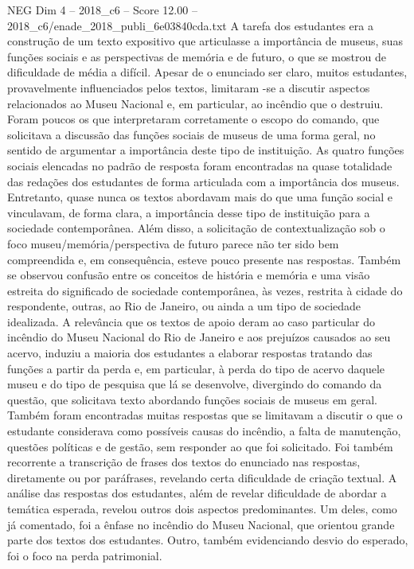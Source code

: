 \begin{textsample}{NEG Dim 4 – 2018\_c6 – Score 12.00 – 2018\_c6/enade\_2018\_publi\_6e03840cda.txt}
A tarefa dos estudantes era a construção de um texto expositivo que articulasse a importância de museus, suas funções sociais e as perspectivas de memória e de futuro, o que se mostrou de dificuldade de média a difícil.
Apesar de o enunciado ser claro, muitos estudantes, provavelmente influenciados pelos textos, limitaram -se a discutir aspectos relacionados ao Museu Nacional e, em particular, ao incêndio que o destruiu.
Foram poucos os que interpretaram corretamente o escopo do comando, que solicitava a discussão das funções sociais de museus de uma forma geral, no sentido de argumentar a importância deste tipo de instituição.
As quatro funções sociais elencadas no padrão de resposta foram encontradas na quase totalidade das redações dos estudantes de forma articulada com a importância dos museus.
Entretanto, quase nunca os textos abordavam mais do que uma função social e vinculavam, de forma clara, a importância desse tipo de instituição para a sociedade contemporânea.
Além disso, a solicitação de contextualização sob o foco museu/memória/perspectiva de futuro parece não ter sido bem compreendida e, em consequência, esteve pouco presente nas respostas.
Também se observou confusão entre os conceitos de história e memória e uma visão estreita do significado de sociedade contemporânea, às vezes, restrita à cidade do respondente, outras, ao Rio de Janeiro, ou ainda a um tipo de sociedade idealizada.
A relevância que os textos de apoio deram ao caso particular do incêndio do Museu Nacional do Rio de Janeiro e aos prejuízos causados ao seu acervo, induziu a maioria dos estudantes a elaborar respostas tratando das funções a partir da perda e, em particular, à perda do tipo de acervo daquele museu e do tipo de pesquisa que lá se desenvolve, divergindo do comando da questão, que solicitava texto abordando funções sociais de museus em geral.
Também foram encontradas muitas respostas que se limitavam a discutir o que o estudante considerava como possíveis causas do incêndio, a falta de manutenção, questões políticas e de gestão, sem responder ao que foi solicitado.
Foi também recorrente a transcrição de frases dos textos do enunciado nas respostas, diretamente ou por paráfrases, revelando certa dificuldade de criação textual.
A análise das respostas dos estudantes, além de revelar dificuldade de abordar a temática esperada, revelou outros dois aspectos predominantes.
Um deles, como já comentado, foi a ênfase no incêndio do Museu Nacional, que orientou grande parte dos textos dos estudantes.
Outro, também evidenciando desvio do esperado, foi o foco na perda patrimonial.

\end{textsample}
